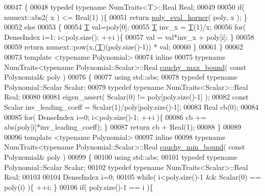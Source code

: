 \begin{DoxyCode}
00047 \{
00048   \textcolor{keyword}{typedef} \textcolor{keyword}{typename} NumTraits<T>::Real Real;
00049 
00050   \textcolor{keywordflow}{if}( numext::abs2( x ) <= Real(1) )\{
00051     \textcolor{keywordflow}{return} \hyperlink{namespace_eigen_aadbf059bc28ce1cf94c57c1454633d40}{poly\_eval\_horner}( poly, x ); \}
00052   \textcolor{keywordflow}{else}
00053   \{
00054     \hyperlink{group___sparse_core___module_class_eigen_1_1_triplet}{T} val=poly[0];
00055     \hyperlink{group___sparse_core___module_class_eigen_1_1_triplet}{T} inv\_x = \hyperlink{group___sparse_core___module_class_eigen_1_1_triplet}{T}(1)/x;
00056     \textcolor{keywordflow}{for}( DenseIndex i=1; i<poly.size(); ++i )\{
00057       val = val*inv\_x + poly[i]; \}
00058 
00059     \textcolor{keywordflow}{return} numext::pow(x,(\hyperlink{group___sparse_core___module_class_eigen_1_1_triplet}{T})(poly.size()-1)) * val;
00060   \}
00061 \}
00062 
00073 \textcolor{keyword}{template} <\textcolor{keyword}{typename} Polynomial>
00074 \textcolor{keyword}{inline}
00075 \textcolor{keyword}{typename} NumTraits<typename Polynomial::Scalar>::Real \hyperlink{namespace_eigen_ac90ec4513aa09bb8ad54daa209322d03}{cauchy\_max\_bound}( \textcolor{keyword}{const} Polynomial& 
      poly )
00076 \{
00077   \textcolor{keyword}{using} std::abs;
00078   \textcolor{keyword}{typedef} \textcolor{keyword}{typename} Polynomial::Scalar Scalar;
00079   \textcolor{keyword}{typedef} \textcolor{keyword}{typename} NumTraits<Scalar>::Real Real;
00080 
00081   eigen\_assert( Scalar(0) != poly[poly.size()-1] );
00082   \textcolor{keyword}{const} Scalar inv\_leading\_coeff = Scalar(1)/poly[poly.size()-1];
00083   Real cb(0);
00084 
00085   \textcolor{keywordflow}{for}( DenseIndex i=0; i<poly.size()-1; ++i )\{
00086     cb += abs(poly[i]*inv\_leading\_coeff); \}
00087   \textcolor{keywordflow}{return} cb + Real(1);
00088 \}
00089 
00096 \textcolor{keyword}{template} <\textcolor{keyword}{typename} Polynomial>
00097 \textcolor{keyword}{inline}
00098 \textcolor{keyword}{typename} NumTraits<typename Polynomial::Scalar>::Real \hyperlink{namespace_eigen_a43f0af310d5cc131eb5e806f241af951}{cauchy\_min\_bound}( \textcolor{keyword}{const} Polynomial& 
      poly )
00099 \{
00100   \textcolor{keyword}{using} std::abs;
00101   \textcolor{keyword}{typedef} \textcolor{keyword}{typename} Polynomial::Scalar Scalar;
00102   \textcolor{keyword}{typedef} \textcolor{keyword}{typename} NumTraits<Scalar>::Real Real;
00103 
00104   DenseIndex i=0;
00105   \textcolor{keywordflow}{while}( i<poly.size()-1 && Scalar(0) == poly(i) )\{ ++i; \}
00106   \textcolor{keywordflow}{if}( poly.size()-1 == i )\{

\end{DoxyCode}
